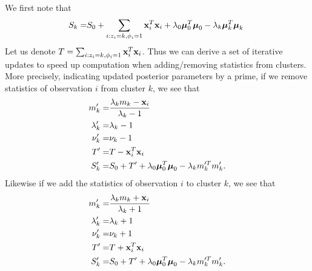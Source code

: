 \documentclass[12pt,english]{article}\usepackage[]{graphicx}\usepackage[]{color}
\begin{document}
We first note that
\begin{equation}
\begin{split}
S_k = & S_0 + \sum_{i:z_i = k, \phi_i = 1}{\bf x}_i^{T}{\bf x}_i + \lambda_0\boldsymbol{\mu}_0^T\boldsymbol{\mu}_0 - \lambda_k\boldsymbol{\mu}_k^T \boldsymbol{\mu}_k \ \\
\end{split}
\end{equation}
Let us denote $T = \sum_{i:z_i = k, \phi_i = 1}{\bf x}_i^{T}{\bf x}_i$. Thus we can derive a set of iterative updates to speed up computation when adding/removing statistics from clusters. More precisely, indicating updated posterior parameters by a prime, if we remove statistics of observation $i$ from cluster $k$, we see that
\begin{equation}
\begin{split}
m'_k = & \frac{\lambda_k m_k - {\bf x}_i}{\lambda_k - 1}\\
\lambda'_k = & \lambda_k -1\\
\nu'_k = & \nu_k -1  \\
T' = & T - {\bf x}_i^T{\bf x}_i \\
S'_k = & S_0 + T' + \lambda_0\boldsymbol{\mu}_0^T\boldsymbol{\mu}_0 - \lambda_km_k'^T m_k'. \\
\end{split}
\end{equation}
Likewise if we add the statistics of observation $i$ to cluster $k$, we see that
\begin{equation}
\begin{split}
m'_k = & \frac{\lambda_k m_k + {\bf x}_i}{\lambda_k + 1}\\
\lambda'_k = & \lambda_k +1\\
\nu'_k = & \nu_k +1  \\
T' = & T + {\bf x}_i^T{\bf x}_i \\
S'_k = & S_0 + T' + \lambda_0\boldsymbol{\mu}_0^T\boldsymbol{\mu}_0 - \lambda_km_k'^T m_k'.\\
\end{split}
\end{equation}

\clearpage
\end{document}
